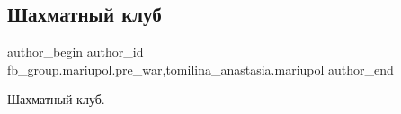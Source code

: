  
 
 
 
 

\subsection{Шахматный клуб}
\label{sec:11_02_2023.fb.fb_group.mariupol.pre_war.3.shakhmatnii_klub}
 
\ifcmt
 author_begin
   author_id fb_group.mariupol.pre_war,tomilina_anastasia.mariupol
 author_end
\fi

Шахматный клуб.

